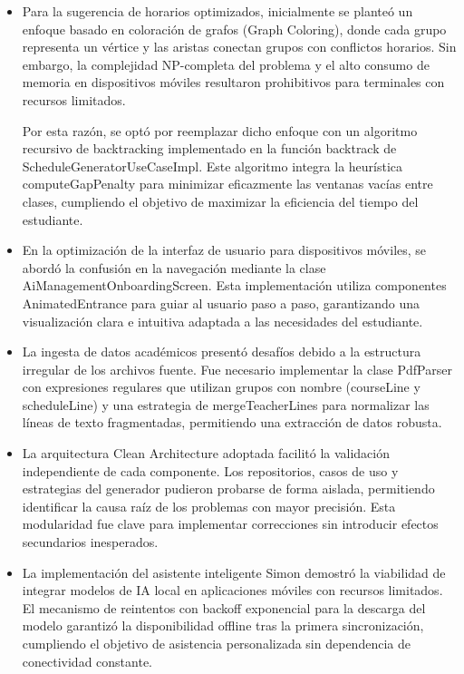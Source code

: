\begin{itemize}
\item Para la sugerencia de horarios optimizados, inicialmente se planteó un enfoque basado en coloración de grafos (Graph Coloring), donde cada grupo representa un vértice y las aristas conectan grupos con conflictos horarios. Sin embargo, la complejidad NP-completa del problema y el alto consumo de memoria en dispositivos móviles resultaron prohibitivos para terminales con recursos limitados.

Por esta razón, se optó por reemplazar dicho enfoque con un algoritmo recursivo de backtracking implementado en la función backtrack de ScheduleGeneratorUseCaseImpl. Este algoritmo integra la heurística computeGapPenalty para minimizar eficazmente las ventanas vacías entre clases, cumpliendo el objetivo de maximizar la eficiencia del tiempo del estudiante.

\item En la optimización de la interfaz de usuario para dispositivos móviles, se abordó la confusión en la navegación mediante la clase AiManagementOnboardingScreen. Esta implementación utiliza componentes AnimatedEntrance para guiar al usuario paso a paso, garantizando una visualización clara e intuitiva adaptada a las necesidades del estudiante.

\item La ingesta de datos académicos presentó desafíos debido a la estructura irregular de los archivos fuente. Fue necesario implementar la clase PdfParser con expresiones regulares que utilizan grupos con nombre (courseLine y scheduleLine) y una estrategia de mergeTeacherLines para normalizar las líneas de texto fragmentadas, permitiendo una extracción de datos robusta.

\item La arquitectura Clean Architecture adoptada facilitó la validación independiente de cada componente. Los repositorios, casos de uso y estrategias del generador pudieron probarse de forma aislada, permitiendo identificar la causa raíz de los problemas con mayor precisión. Esta modularidad fue clave para implementar correcciones sin introducir efectos secundarios inesperados.

\item La implementación del asistente inteligente Simon demostró la viabilidad de integrar modelos de IA local en aplicaciones móviles con recursos limitados. El mecanismo de reintentos con backoff exponencial para la descarga del modelo garantizó la disponibilidad offline tras la primera sincronización, cumpliendo el objetivo de asistencia personalizada sin dependencia de conectividad constante.


\end{itemize}
